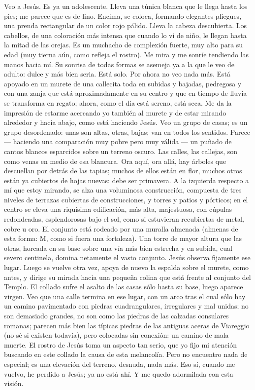 \documentclass[12pt]{book} %
\begin{document}
Veo a Jesús. Es ya un adolescente. Lleva una túnica blanca que le llega hasta los pies; me parece que es de lino. Encima, se coloca, formando elegantes pliegues, una prenda rectangular de un color rojo pálido. Lleva la cabeza descubierta. Los cabellos, de una coloración más intensa que cuando lo vi de niño, le llegan hasta la mitad de las orejas. Es un muchacho de complexión fuerte, muy alto para su edad (muy tierna aún, como refleja el rostro). 
Me mira y me sonríe tendiendo las manos hacia mí. Su sonrisa de todas formas se asemeja ya a la que le veo de adulto: dulce y más bien seria. Está solo. Por ahora no veo nada más. Está apoyado en un murete de una callecita toda en subidas y bajadas, pedregosa y con una zanja que está aproximadamente en su centro y que en tiempo de lluvia se transforma en regato; ahora, como el día está sereno, está seca.                      
Me da la impresión de estarme acercando yo también al murete y de estar mirando alrededor y hacia abajo, como está 
haciendo Jesús. Veo un grupo de casas; es un grupo desordenado: unas son altas, otras, bajas; van en todos los sentidos. Parece — haciendo una comparación muy pobre pero muy válida — un puñado de cantos blancos esparcidos sobre un terreno oscuro. Las calles, las callejas, son como venas en medio de esa blancura. Ora aquí, ora allá, hay árboles que descuellan por detrás de las tapias; muchos de ellos están en flor, muchos otros están ya cubiertos de hojas nuevas: debe ser primavera. 
A la izquierda respecto a mí que estoy mirando, se alza una voluminosa construcción, compuesta de tres niveles de 
terrazas cubiertas de construcciones, y torres y patios y pórticos; en el centro se eleva una riquísima edificación, más alta, majestuosa, con cúpulas redondeadas, esplendorosas bajo el sol, como si estuvieran recubiertas de metal, cobre u oro. El conjunto está rodeado por una muralla almenada (almenas de esta forma: M, como si fuera una fortaleza). Una torre de mayor altura que las otras, horcada en su base sobre una vía más bien estrecha y en subida, cual severo centinela, domina netamente el vasto conjunto. 
Jesús observa fijamente ese lugar. Luego se vuelve otra vez, apoya de nuevo la espalda sobre el murete, como antes, y 
dirige su mirada hacia una pequeña colina que está frente al conjunto del Templo. El collado sufre el asalto de las casas sólo hasta su base, luego aparece virgen. Veo que una calle termina en ese lugar, con un arco tras el cual sólo hay un camino pavimentado con piedras cuadrangulares, irregulares y mal unidas; no son demasiado grandes, no son como las piedras de las calzadas consulares romanas; parecen más bien las típicas piedras de las antiguas aceras de Viareggio (no sé si existen todavía), pero colocadas sin conexión: un camino de mala muerte. El rostro de Jesús toma un aspecto tan serio, que yo fijo mi atención buscando en este collado la causa de esta melancolía. Pero no encuentro nada de especial; es una elevación del terreno, desnuda, nada más. Eso sí, cuando me vuelvo, he perdido a Jesús; ya no está ahí. Y me quedo adormilada con esta visión. 
\end{document}
